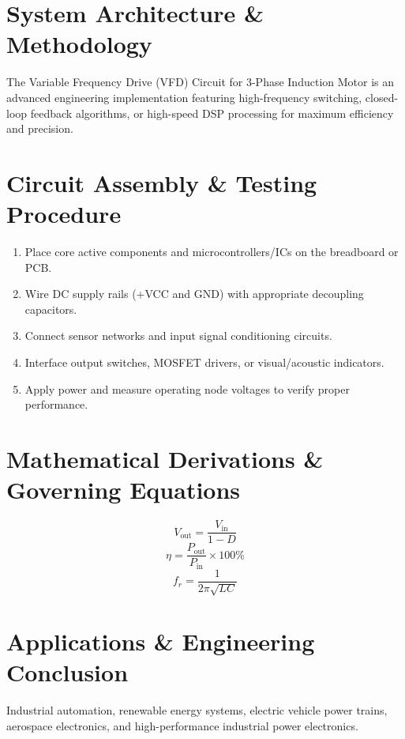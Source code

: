 \documentclass[11pt,a4paper]{article}
\begin{document}
\section{System Architecture \& Methodology}
The Variable Frequency Drive (VFD) Circuit for 3-Phase Induction Motor is an advanced engineering implementation featuring high-frequency switching, closed-loop feedback algorithms, or high-speed DSP processing for maximum efficiency and precision.

\section{Circuit Assembly \& Testing Procedure}
\begin{enumerate}
    \item Place core active components and microcontrollers/ICs on the breadboard or PCB.
    \item Wire DC supply rails (+VCC and GND) with appropriate decoupling capacitors.
    \item Connect sensor networks and input signal conditioning circuits.
    \item Interface output switches, MOSFET drivers, or visual/acoustic indicators.
    \item Apply power and measure operating node voltages to verify proper performance.
\end{enumerate}

\section{Mathematical Derivations \& Governing Equations}
\begin{equation}
V_{\text{out}} = \frac{V_{\text{in}}}{1 - D}
\end{equation}
\begin{equation}
\eta = \frac{P_{\text{out}}}{P_{\text{in}}} \times 100\%
\end{equation}
\begin{equation}
f_r = \frac{1}{2\pi \sqrt{L C}}
\end{equation}

\section{Applications \& Engineering Conclusion}
Industrial automation, renewable energy systems, electric vehicle power trains, aerospace electronics, and high-performance industrial power electronics.
\end{document}
